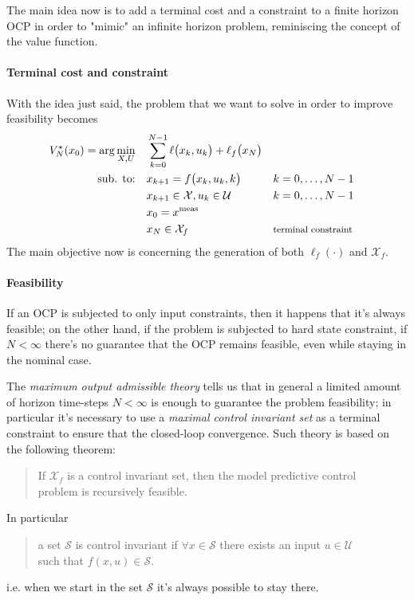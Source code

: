 	The main idea now is to add a terminal cost and a constraint to a finite horizon OCP in order to "mimic" an infinite horizon problem, reminiscing the concept of the value function.
	
	\paragraph{Terminal cost and constraint} With the idea just said, the problem that we want to solve in order to improve feasibility becomes
	\begin{equation}
		\begin{aligned}
			V_N^\star(x_0)=  \arg \min_{X,U} \quad & \sum_{k=0}^{N-1} \ell \big(x_k, u_k\big) + \ell_f\big(x_N \big)\\
			\textrm{sub. to:}\quad & x_{k+1} = f\big(x_k, u_k, k\big) && k = 0,\dots, N-1 \\
			&x_{k+1} \in \mathcal X, u_k \in \mathcal U && k = 0,\dots, N-1 \\
			& x_0 = x^\textrm{meas} \\
			& x_N \in \mathcal X_f && {\footnotesize \text{terminal constraint}}
		\end{aligned}
	\end{equation}
	The main objective now is concerning the generation of both $\ell_f(\cdot)$ and $\mathcal X_f$.
	
	\paragraph{Feasibility} If an OCP is subjected to only input constraints, then it happens that it's always feasible; on the other hand, if the problem is subjected to hard state constraint, if $N < \infty$ there's no guarantee that the OCP remains feasible, even while staying in the nominal case.
	
	The \textit{maximum output admissible theory} tells us that in general a limited amount of horizon time-steps $N < \infty$ is enough to guarantee the problem feasibility; in particular it's necessary to use a \textit{maximal control invariant set} as a terminal constraint to ensure that the closed-loop convergence. Such theory is based on the following theorem:
	\begin{quote}
		If $\mathcal X_f$ is a control invariant set, then the model predictive control \\ problem is recursively feasible.
	\end{quote} 
	In particular
	\begin{quote}
		a set $\mathcal S$ is control invariant if $\forall x \in \mathcal S$ there exists an input $u\in \mathcal U$ \\ such that $f(x, u) \in \mathcal S$.
	\end{quote}
	i.e. when we start in the set $\mathcal S$ it's always possible to stay there.
	
